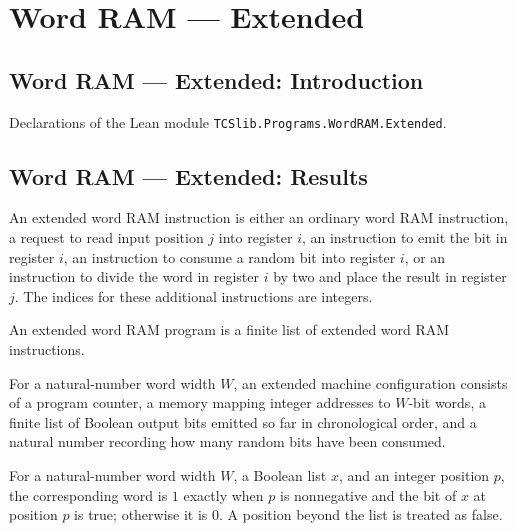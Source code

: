 \section{Word RAM --- Extended}
\subsection*{Word RAM --- Extended: Introduction}

Declarations of the Lean module \texttt{TCSlib.Programs.WordRAM.Extended}.

\subsection*{Word RAM --- Extended: Results}

\begin{definition}
\label{WordRAM.XInstr}
\leanok
{}
An extended word RAM instruction is either an ordinary word RAM instruction, a request
to read input position $j$ into register $i$, an instruction to emit the bit in register
$i$, an instruction to consume a random bit into register $i$, or an instruction to
divide the word in register $i$ by two and place the result in register $j$. The indices
for these additional instructions are integers.
\end{definition}

\begin{definition}
\label{WordRAM.XProgram}
\leanok
{}
An extended word RAM program is a finite list of extended word RAM instructions.
\end{definition}

\begin{definition}
\label{WordRAM.XCfg}
\leanok
{}
For a natural-number word width $W$, an extended machine configuration consists of a
program counter, a memory mapping integer addresses to $W$-bit words, a finite list of
Boolean output bits emitted so far in chronological order, and a natural number
recording how many random bits have been consumed.
\end{definition}

\begin{definition}
\label{WordRAM.inBitWord}
\leanok
For a natural-number word width $W$, a Boolean list $x$, and an integer position $p$,
the corresponding word is $1$ exactly when $p$ is nonnegative and the bit of $x$ at
position $p$ is true; otherwise it is $0$. A position beyond the list is treated as
false.
\end{definition}

